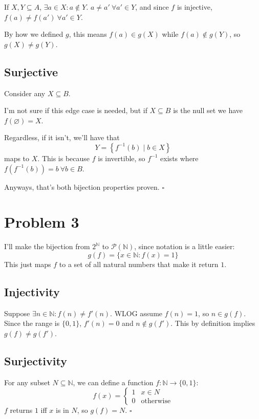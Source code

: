 \documentclass[12pt]{article}
\newcommand{\N}{\mathbb{N}}
\begin{document}
If $X, Y \subseteq A$, $\exists a \in X: a \notin Y$.
$a \ne a'\ \forall a' \in Y$, and since $f$ is injective, $f(a) \ne f(a')\ \forall a' \in Y$.

By how we defined $g$, this means $f(a) \in g(X)$ while $f(a) \notin g(Y)$, so $g(X) \ne g(Y)$.

\subsection{Surjective}

Consider any $X \subseteq B$.

I'm not sure if this edge case is needed, but if $X \subseteq B$ is the null set we have $f(\varnothing)=X$.

Regardless, if it isn't, we'll have that
\[Y=\left\{f^{-1}(b) \mid b \in X\right\}\]
maps to $X$.
This is because $f$ is invertible, so $f^{-1}$ exists where $f\left(f^{-1}(b)\right)=b\ \forall b \in B$.

Anyways, that's both bijection properties proven. $\square$

\section{Problem 3}

I'll make the bijection from $2^\N$ to $\mathcal{P}(\N)$, since notation is a little easier:
\[g(f)=\{x \in \N: f(x)=1\}\]
This just maps $f$ to a set of all natural numbers that make it return $1$.

\subsection{Injectivity}

Suppose $\exists n \in \N: f(n) \ne f'(n)$.
WLOG assume $f(n)=1$, so $n \in g(f)$.
Since the range is $\{0, 1\}$, $f'(n)=0$ and $n \notin g(f')$.
This by definition implies $g(f) \ne  g(f')$.

\subsection{Surjectivity}

For any subset $N \subseteq \N$, we can define a function $f: \N \to \{0, 1\}$:
\[f(x)=\begin{cases}
    1 & x \in N          \\
    0 & \text{otherwise}
  \end{cases}\]
$f$ returns $1$ iff $x$ is in $N$, so $g(f)=N$. $\square$
\end{document}
